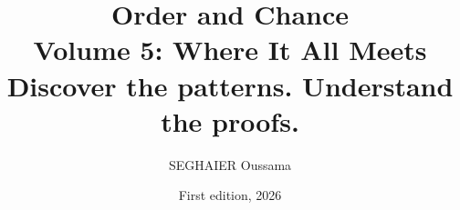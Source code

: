 \documentclass[11pt,openany]{book}
\title{\Huge\textbf{Order and Chance}\\[0.4em]\LARGE Volume 5: Where It All Meets\\[0.6em]
\Large Discover the patterns. Understand the proofs.}
\author{SEGHAIER Oussama}
\date{First edition, 2026}
\begin{document}
\frontmatter
\makecover
\maketitle

\tableofcontents

\mainmatter













\end{document}
